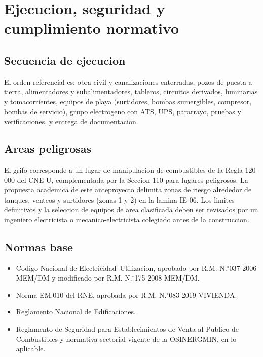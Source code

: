 \chapter{Ejecucion, seguridad y cumplimiento normativo}

\section{Secuencia de ejecucion}
El orden referencial es: obra civil y canalizaciones enterradas, pozos de
puesta a tierra, alimentadores y subalimentadores, tableros, circuitos
derivados, luminarias y tomacorrientes, equipos de playa (surtidores, bombas
sumergibles, compresor, bombas de servicio), grupo electrogeno con ATS, UPS,
pararrayo, pruebas y verificaciones, y entrega de documentacion.

\section{Areas peligrosas}
El grifo corresponde a un lugar de manipulacion de combustibles de la Regla
120-000 del CNE-U, complementada por la Seccion 110 para lugares peligrosos.
La propuesta academica de este anteproyecto delimita zonas de riesgo alrededor
de tanques, venteos y surtidores (zonas 1 y 2) en la lamina IE-06. Los limites
definitivos y la seleccion de equipos de area clasificada deben ser revisados
por un ingeniero electricista o mecanico-electricista colegiado antes de la
construccion.

\section{Normas base}
\begin{itemize}
\item Codigo Nacional de Electricidad--Utilizacion, aprobado por R.M. N.\({}^\circ\)037-2006-MEM/DM y modificado por R.M. N.\({}^\circ\)175-2008-MEM/DM.
\item Norma EM.010 del RNE, aprobada por R.M. N.\({}^\circ\)083-2019-VIVIENDA.
\item Reglamento Nacional de Edificaciones.
\item Reglamento de Seguridad para Establecimientos de Venta al Publico de Combustibles y normativa sectorial vigente de la OSINERGMIN, en lo aplicable.
\end{itemize}

